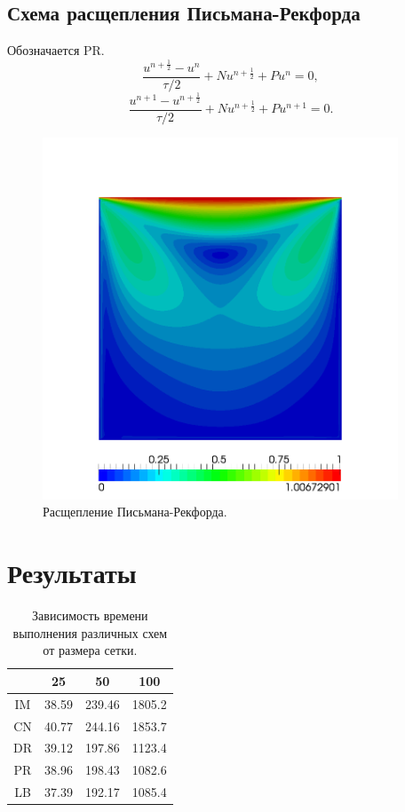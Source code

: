 \documentclass[12pt]{article}
\begin{document}
\subsection{Схема расщепления Письмана-Рекфорда}
Обозначается PR.
\begin{equation}
\frac{u^{n+\frac{1}{2}}-u^n}{\tau/2} + Nu^{n+\frac{1}{2}}+Pu^n=0,
\end{equation}
\begin{equation}
\frac{u^{n+1}-u^{n+\frac{1}{2}}}{\tau/2} + Nu^{n+\frac{1}{2}}+Pu^{n+1}=0.
\end{equation}
\begin{figure}
	\begin{center}
		\includegraphics[width=400px]{pics/pr}
		\caption{Расщепление Письмана-Рекфорда.}
		\label{fg:velocity-pr}
	\end{center}
\end{figure}

\section{Результаты}
\begin{table}
    \begin{center}
	\begin{tabular}{|c|c|c|c|}
	    \hline	
	     & 25 & 50 & 100 \\
	    \hline	
	    IM & 38.59 & 239.46 & 1805.2 \\
	    \hline
	    CN & 40.77 & 244.16 & 1853.7 \\
	    \hline
	    DR & 39.12 & 197.86 & 1123.4 \\
	    \hline
	    PR & 38.96 & 198.43 & 1082.6 \\
	    \hline
	    LB & 37.39 & 192.17 & 1085.4 \\
	    \hline
	\end{tabular}	
	\caption{Зависимость времени выполнения различных схем от размера сетки.}
	\label{tb:time1}	 
	\end{center}
\end{table}	
\end{document}
